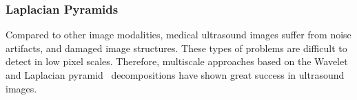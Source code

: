 
\subsubsection{Laplacian Pyramids}\label{section:pyramid}
%
Compared to other image modalities, medical ultrasound images suffer from noise artifacts, and damaged image structures.
These types of problems are difficult to detect in low pixel scales.
Therefore, multiscale approaches based on the Wavelet~\cite{xulizong_speckle_1998, xiaohuihao_novel_1999, pizurica_versatile_2003, yongyue_nonlinear_2006} and Laplacian pyramid~\cite{sattar_image_1997, zhang_multiscale_2006, zhang_nonlinear_2007, kang_new_2016} decompositions have shown great success in ultrasound images.

